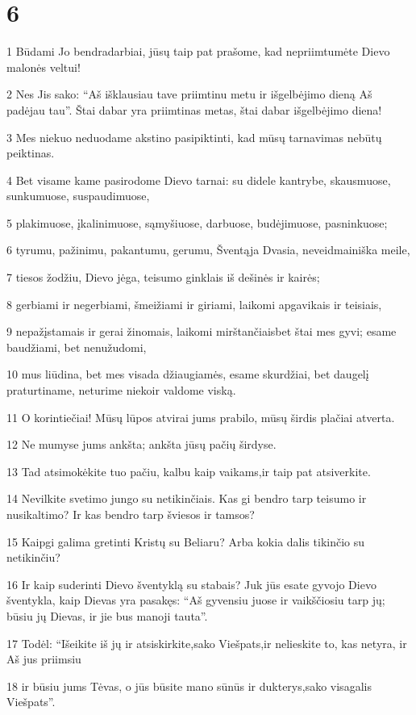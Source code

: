 \chapter{6}


\par 1 Būdami Jo bendradarbiai, jūsų taip pat prašome, kad nepriimtumėte Dievo malonės veltui! 
\par 2 Nes Jis sako: “Aš išklausiau tave priimtinu metu ir išgelbėjimo dieną Aš padėjau tau”. Štai dabar yra priimtinas metas, štai dabar išgelbėjimo diena! 
\par 3 Mes niekuo neduodame akstino pasipiktinti, kad mūsų tarnavimas nebūtų peiktinas. 
\par 4 Bet visame kame pasirodome Dievo tarnai: su didele kantrybe, skausmuose, sunkumuose, suspaudimuose, 
\par 5 plakimuose, įkalinimuose, sąmyšiuose, darbuose, budėjimuose, pasninkuose; 
\par 6 tyrumu, pažinimu, pakantumu, gerumu, Šventąja Dvasia, neveidmainiška meile, 
\par 7 tiesos žodžiu, Dievo jėga, teisumo ginklais iš dešinės ir kairės; 
\par 8 gerbiami ir negerbiami, šmeižiami ir giriami, laikomi apgavikais ir teisiais, 
\par 9 nepažįstamais ir gerai žinomais, laikomi mirštančiais­bet štai mes gyvi; esame baudžiami, bet nenužudomi, 
\par 10 mus liūdina, bet mes visada džiaugiamės, esame skurdžiai, bet daugelį praturtiname, neturime nieko­ir valdome viską. 
\par 11 O korintiečiai! Mūsų lūpos atvirai jums prabilo, mūsų širdis plačiai atverta. 
\par 12 Ne mumyse jums ankšta; ankšta jūsų pačių širdyse. 
\par 13 Tad atsimokėkite tuo pačiu,­ kalbu kaip vaikams,­ir taip pat atsiverkite. 
\par 14 Nevilkite svetimo jungo su netikinčiais. Kas gi bendro tarp teisumo ir nusikaltimo? Ir kas bendro tarp šviesos ir tamsos? 
\par 15 Kaipgi galima gretinti Kristų su Beliaru? Arba kokia dalis tikinčio su netikinčiu? 
\par 16 Ir kaip suderinti Dievo šventyklą su stabais? Juk jūs esate gyvojo Dievo šventykla, kaip Dievas yra pasakęs: “Aš gyvensiu juose ir vaikščiosiu tarp jų; būsiu jų Dievas, ir jie bus manoji tauta”. 
\par 17 Todėl: “Išeikite iš jų ir atsiskirkite,­sako Viešpats,­ir nelieskite to, kas netyra, ir Aš jus priimsiu 
\par 18 ir būsiu jums Tėvas, o jūs būsite mano sūnūs ir dukterys,­sako visagalis Viešpats”.



